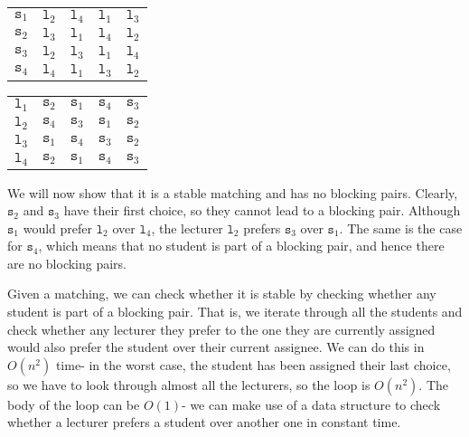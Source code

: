 \documentclass[a4paper, openany]{memoir}
\begin{document}
    \begin{table}[H]
        \centering
        \begin{subtable}{0.45\textwidth}
            \centering
            \begin{tabular}{c|cccc}
                $\texttt{s}_1$ & $\texttt{l}_2$ & \underline{$\texttt{l}_4$} & $\texttt{l}_1$ & $\texttt{l}_3$ \\
                $\texttt{s}_2$ & \underline{$\texttt{l}_3$} & $\texttt{l}_1$ & $\texttt{l}_4$ & $\texttt{l}_2$ \\
                $\texttt{s}_3$ & \underline{$\texttt{l}_2$} & $\texttt{l}_3$ & $\texttt{l}_1$ & $\texttt{l}_4$ \\
                $\texttt{s}_4$ & $\texttt{l}_4$ & \underline{$\texttt{l}_1$} & $\texttt{l}_3$ & $\texttt{l}_2$
            \end{tabular}
        \end{subtable}
        \hfill
        \begin{subtable}{0.45\textwidth}
            \centering
            \begin{tabular}{c|cccc}
                $\texttt{l}_1$ & $\texttt{s}_2$ & $\texttt{s}_1$ & \underline{$\texttt{s}_4$} & $\texttt{s}_3$ \\
                $\texttt{l}_2$ & $\texttt{s}_4$ & \underline{$\texttt{s}_3$} & $\texttt{s}_1$ & $\texttt{s}_2$ \\
                $\texttt{l}_3$ & $\texttt{s}_1$ & $\texttt{s}_4$ & $\texttt{s}_3$ & \underline{$\texttt{s}_2$} \\
                $\texttt{l}_4$ & $\texttt{s}_2$ & \underline{$\texttt{s}_1$} & $\texttt{s}_4$ & $\texttt{s}_3$
            \end{tabular}
        \end{subtable}
    \end{table}
    \noindent We will now show that it is a stable matching and has no blocking pairs. Clearly, $\texttt{s}_2$ and $\texttt{s}_3$ have their first choice, so they cannot lead to a blocking pair. Although $\texttt{s}_1$ would prefer $\texttt{l}_2$ over $\texttt{l}_4$, the lecturer $\texttt{l}_2$ prefers $\texttt{s}_3$ over $\texttt{s}_1$. The same is the case for $\texttt{s}_4$, which means that no student is part of a blocking pair, and hence there are no blocking pairs.

    Given a matching, we can check whether it is stable by checking whether any student is part of a blocking pair. That is, we iterate through all the students and check whether any lecturer they prefer to the one they are currently assigned would also prefer the student over their current assignee. We can do this in $O(n^2)$ time- in the worst case, the student has been assigned their last choice, so we have to look through almost all the lecturers, so the loop is $O(n^2)$. The body of the loop can be $O(1)$- we can make use of a data structure to check whether a lecturer prefers a student over another one in constant time.
\end{document}
